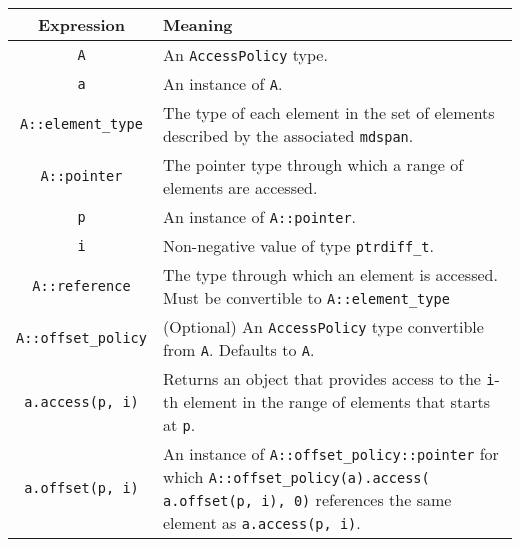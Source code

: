 \begin{tabular}{|c|p{15em}|}
\hline
Expression & Meaning \\
\hline
    \texttt{A} & An \texttt{AccessPolicy} type. \\
    \texttt{a} & An instance of \texttt{A}. \\
    \texttt{A::element\_type} & The type of each element in the set of elements described by the associated \texttt{mdspan}. \\
    \texttt{A::pointer} & The pointer type through which a range of elements are accessed. \\
    \texttt{p} & An instance of \texttt{A::pointer}. \\
    \texttt{i} & Non-negative value of type \texttt{ptrdiff\_t}. \\
    \texttt{A::reference} & The type through which an element is accessed.  Must be convertible to \texttt{A::element\_type} \\
    \texttt{A::offset\_policy} & (Optional) An \texttt{AccessPolicy} type convertible from \texttt{A}. Defaults to \texttt{A}. \\
    \texttt{a.access(p, i)} & Returns an object that provides access to the \texttt{i}-th element in the range of elements that starts at \texttt{p}. \\
    \texttt{a.offset(p, i)} & An instance of \texttt{A::offset\_policy::pointer} for which \texttt{A::offset\_policy(a).access( a.offset(p, i), 0)} references the same element as \texttt{a.access(p, i)}. \\
\hline
\end{tabular}
